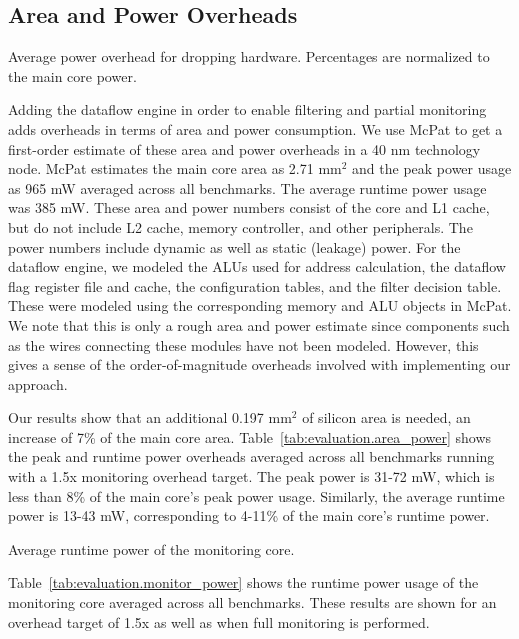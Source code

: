 \subsection{Area and Power Overheads}

\begin{table}[tb]
  \begin{center}
    \begin{footnotesize}
    
    \end{footnotesize}
    \caption{Average power overhead for dropping hardware. Percentages 
    are normalized to the main core power.}
    \label{tab:monitoring_dift_drop.evaluation.area_power}
  \end{center}
\end{table}

Adding the dataflow engine in order to enable filtering and partial monitoring adds
overheads in terms of area and power consumption. We use McPat \cite{mcpat-micro09} to get
a first-order estimate of these area and power overheads in a 40 nm technology
node. McPat estimates the main core area as 2.71 mm$^2$ and the peak power usage as
965 mW averaged across all benchmarks. The average runtime power usage was 385 
mW. These area and power numbers consist of the core and
L1 cache, but do not include L2 cache, memory controller, and other
peripherals. The power numbers include dynamic as well as static (leakage)
power. For the dataflow engine, we modeled the ALUs used for address
calculation, the dataflow flag register file and cache, the configuration
tables, and the filter decision table. These were modeled using the
corresponding memory and ALU objects in McPat. We
note that this is only a rough area and power estimate since components such as the
wires connecting these modules have not been modeled. However, this gives a
sense of the order-of-magnitude overheads involved with implementing our
approach.

Our results show that an additional 0.197 mm$^2$ of silicon area is needed, an
increase of 7\% of the main core area. Table~\ref{tab:evaluation.area_power}
shows the peak and runtime power overheads averaged across all benchmarks running with
a 1.5x monitoring overhead target. The peak power is 31-72 mW, which is
less than 8\% of the main core's peak power usage. Similarly, the average runtime power is 13-43
mW, corresponding to 4-11\% of the main core's runtime power.

\begin{table}[tb]
  \begin{center}
    \begin{footnotesize}
    
    \end{footnotesize}
    \caption{Average runtime power of the monitoring core.}
    \label{tab:monitoring_dift_drop.evaluation.monitor_power}
  \end{center}
\end{table}

Table~\ref{tab:evaluation.monitor_power} shows the runtime power usage of the
monitoring core averaged across all benchmarks. These results are shown for an
overhead target of 1.5x as well as when full monitoring is performed.

